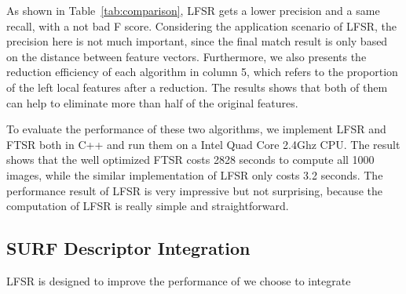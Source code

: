 As shown in Table~\ref{tab:comparison}, LFSR gets a lower precision and a same recall, with a not bad F score. Considering the application scenario of LFSR, the precision here is not much important, since the final match result is only based on the distance between feature vectors. Furthermore, we also presents the reduction efficiency of each algorithm in column 5, which refers to the proportion of the left local features after a reduction. The results shows that both of them can help to eliminate more than half of the original features.

To evaluate the performance of these two algorithms, we implement LFSR and FTSR both in C++ and run them on a Intel Quad Core 2.4Ghz CPU. The result shows that the well optimized FTSR costs 2828 seconds to compute all 1000 images, while the similar implementation of LFSR only costs 3.2 seconds. The performance result of LFSR is very impressive but not surprising, because the computation of LFSR is really simple and straightforward.

\subsection{SURF Descriptor Integration}
\label{sec:observaion_integration}

LFSR is designed to improve the performance of we choose to integrate 